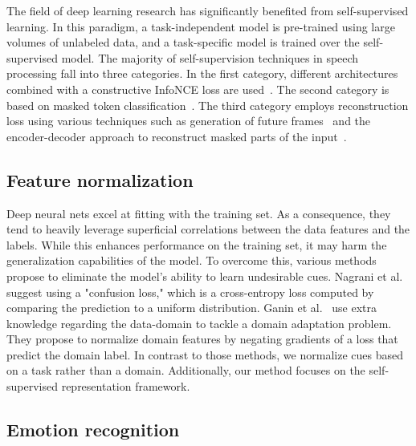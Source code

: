 \documentclass{article}
\renewcommand{\[}{\begin{eqnarray}}
\renewcommand{\]}{\end{eqnarray}}
\begin{document}
The field of deep learning research has significantly benefited from self-supervised learning. In this paradigm, a task-independent model is pre-trained using large volumes of unlabeled data, and a task-specific model is  trained over the self-supervised model. The majority of self-supervision techniques in speech processing fall into three categories. In the first category, different architectures combined with a constructive InfoNCE loss are used~\cite{oord2018representation, cpc, modified-cpc, wav2vec, wav2vec2}. The second category is based on masked token classification~\cite{hubert}. The third category employs reconstruction loss using various techniques such as generation of future frames~\cite{apc, vq-apc} and the encoder-decoder approach to reconstruct masked parts of the input~\cite{mockingjay, tera, npc}.

\subsection{Feature normalization}

Deep neural nets excel at fitting with the training set. As a consequence, they tend to heavily leverage superficial correlations between the data features and the labels. While this enhances performance on the training set, it may harm the generalization capabilities of the model. To overcome this, various methods propose to eliminate the model's ability to learn undesirable cues. Nagrani et al.~\cite{nagrani2020disentangled} suggest using a "confusion loss," which is a cross-entropy loss computed by comparing the prediction to a uniform distribution. Ganin et al.~\cite{ganin2015unsupervised} use extra knowledge regarding the data-domain to tackle a domain adaptation problem. They propose to normalize domain features by negating gradients of a loss that predict the domain label. In contrast to those methods, we normalize cues based on a task rather than a domain. Additionally, our method focuses on the self-supervised representation framework.

\subsection{Emotion recognition}
\end{document}

